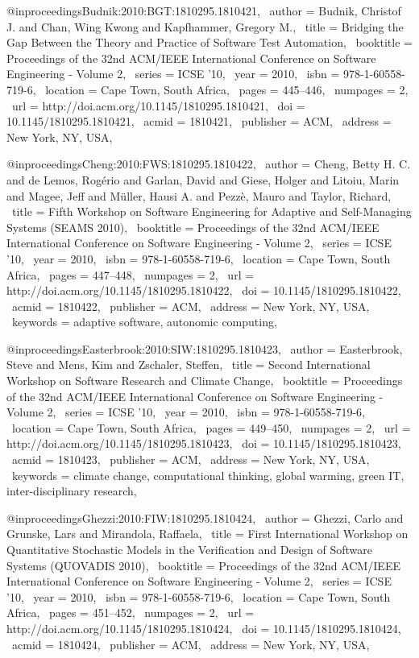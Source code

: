 @inproceedings{Budnik:2010:BGT:1810295.1810421,
 author = {Budnik, Christof J. and Chan, Wing Kwong and Kapfhammer, Gregory M.},
 title = {Bridging the Gap Between the Theory and Practice of Software Test Automation},
 booktitle = {Proceedings of the 32nd ACM/IEEE International Conference on Software Engineering - Volume 2},
 series = {ICSE '10},
 year = {2010},
 isbn = {978-1-60558-719-6},
 location = {Cape Town, South Africa},
 pages = {445--446},
 numpages = {2},
 url = {http://doi.acm.org/10.1145/1810295.1810421},
 doi = {10.1145/1810295.1810421},
 acmid = {1810421},
 publisher = {ACM},
 address = {New York, NY, USA},
} 

@inproceedings{Cheng:2010:FWS:1810295.1810422,
 author = {Cheng, Betty H. C. and de Lemos, Rog{\'e}rio and Garlan, David and Giese, Holger and Litoiu, Marin and Magee, Jeff and M\"{u}ller, Hausi A. and Pezz\`{e}, Mauro and Taylor, Richard},
 title = {Fifth Workshop on Software Engineering for Adaptive and Self-Managing Systems (SEAMS 2010)},
 booktitle = {Proceedings of the 32nd ACM/IEEE International Conference on Software Engineering - Volume 2},
 series = {ICSE '10},
 year = {2010},
 isbn = {978-1-60558-719-6},
 location = {Cape Town, South Africa},
 pages = {447--448},
 numpages = {2},
 url = {http://doi.acm.org/10.1145/1810295.1810422},
 doi = {10.1145/1810295.1810422},
 acmid = {1810422},
 publisher = {ACM},
 address = {New York, NY, USA},
 keywords = {adaptive software, autonomic computing},
} 

@inproceedings{Easterbrook:2010:SIW:1810295.1810423,
 author = {Easterbrook, Steve and Mens, Kim and Zschaler, Steffen},
 title = {Second International Workshop on Software Research and Climate Change},
 booktitle = {Proceedings of the 32nd ACM/IEEE International Conference on Software Engineering - Volume 2},
 series = {ICSE '10},
 year = {2010},
 isbn = {978-1-60558-719-6},
 location = {Cape Town, South Africa},
 pages = {449--450},
 numpages = {2},
 url = {http://doi.acm.org/10.1145/1810295.1810423},
 doi = {10.1145/1810295.1810423},
 acmid = {1810423},
 publisher = {ACM},
 address = {New York, NY, USA},
 keywords = {climate change, computational thinking, global warming, green IT, inter-disciplinary research},
} 

@inproceedings{Ghezzi:2010:FIW:1810295.1810424,
 author = {Ghezzi, Carlo and Grunske, Lars and Mirandola, Raffaela},
 title = {First International Workshop on Quantitative Stochastic Models in the Verification and Design of Software Systems (QUOVADIS 2010)},
 booktitle = {Proceedings of the 32nd ACM/IEEE International Conference on Software Engineering - Volume 2},
 series = {ICSE '10},
 year = {2010},
 isbn = {978-1-60558-719-6},
 location = {Cape Town, South Africa},
 pages = {451--452},
 numpages = {2},
 url = {http://doi.acm.org/10.1145/1810295.1810424},
 doi = {10.1145/1810295.1810424},
 acmid = {1810424},
 publisher = {ACM},
 address = {New York, NY, USA},
} 

